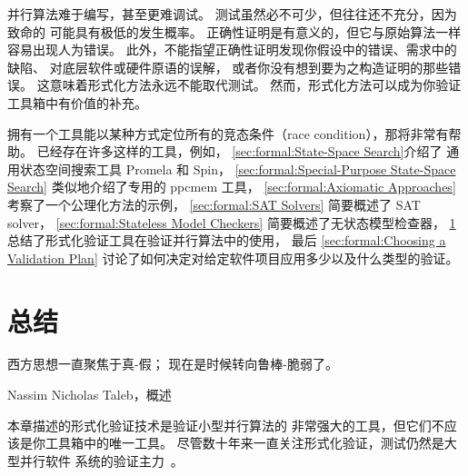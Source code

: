 
%


并行算法难于编写，甚至更难调试。
测试虽然必不可少，但往往还不充分，因为致命的
可能具有极低的发生概率。
正确性证明是有意义的，但它与原始算法一样容易出现人为错误。
此外，不能指望正确性证明发现你假设中的错误、需求中的缺陷、
对底层软件或硬件原语的误解，
或者你没有想到要为之构造证明的那些错误。
这意味着形式化方法永远不能取代测试。
然而，形式化方法可以成为你验证工具箱中有价值的补充。

拥有一个工具能以某种方式定位所有的竞态条件（race condition），那将非常有帮助。
已经存在许多这样的工具，例如，
\cref{sec:formal:State-Space Search}介绍了
通用状态空间搜索工具 Promela 和 Spin，
\cref{sec:formal:Special-Purpose State-Space Search}
类似地介绍了专用的 ppcmem 工具，
\cref{sec:formal:Axiomatic Approaches}
考察了一个公理化方法的示例，
\cref{sec:formal:SAT Solvers}
简要概述了 SAT solver，
\cref{sec:formal:Stateless Model Checkers}
简要概述了无状态模型检查器，
\cref{sec:formal:Summary}
总结了形式化验证工具在验证并行算法中的使用，
最后
\cref{sec:formal:Choosing a Validation Plan}
讨论了如何决定对给定软件项目应用多少以及什么类型的验证。








\section{总结}
\label{sec:formal:Summary}
%
\epigraph{西方思想一直聚焦于真-假；
	  现在是时候转向鲁棒-脆弱了。}
	 {Nassim Nicholas Taleb，概述}

本章描述的形式化验证技术是验证小型并行算法的
非常强大的工具，但它们不应该是你工具箱中的唯一工具。
尽管数十年来一直关注形式化验证，测试仍然是大型并行软件
系统的验证主力~\cite{JonathanCorbet2006lockdep,DaveJones2011Trinity,PaulEMcKenney2016Formal}。

